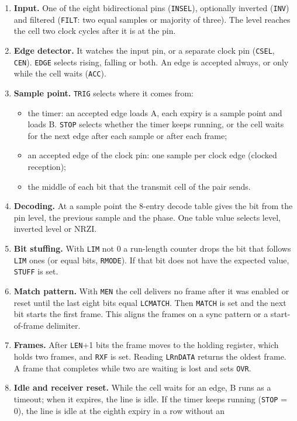\documentclass[10pt,a4paper]{article}
\newcommand{\reg}[1]{\texttt{#1}}
\begin{document}
\begin{enumerate}
\item \textbf{Input.} One of the eight bidirectional pins (\reg{INSEL}), optionally inverted (\reg{INV}) and filtered
(\reg{FILT}: two equal samples or majority of three). The level reaches the cell two clock cycles after it is at
the pin.
\item \textbf{Edge detector.} It watches the input pin, or a separate clock pin (\reg{CSEL}, \reg{CEN}). \reg{EDGE}
selects rising, falling or both. An edge is accepted always, or only while the cell waits (\reg{ACC}).
\item \textbf{Sample point.} \reg{TRIG} selects where it comes from:
  \begin{itemize}
  \item the timer: an accepted edge loads A, each expiry is a sample point and loads B. \reg{STOP} selects whether
  the timer keeps running, or the cell waits for the next edge after each sample or after each frame;
  \item an accepted edge of the clock pin: one sample per clock edge (clocked reception);
  \item the middle of each bit that the transmit cell of the pair sends.
  \end{itemize}
\item \textbf{Decoding.} At a sample point the 8-entry decode table gives the bit from the pin level, the
previous sample and the phase. One table value selects level, inverted level or NRZI.
\item \textbf{Bit stuffing.} With \reg{LIM} not 0 a run-length counter drops the bit that follows \reg{LIM} ones (or
equal bits, \reg{RMODE}). If that bit does not have the expected value, \reg{STUFF} is set.
\item \textbf{Match pattern.} With \reg{MEN} the cell delivers no frame after it was enabled or reset until the last
eight bits equal \reg{LCMATCH}. Then \reg{MATCH} is set and the next bit starts the first frame. This aligns the
frames on a sync pattern or a start-of-frame delimiter.
\item \textbf{Frames.} After \reg{LEN}+1 bits the frame moves to the holding register, which holds two frames, and
\reg{RXF} is set. Reading \reg{LRnDATA} returns the oldest frame. A frame that completes while two are waiting is
lost and sets \reg{OVR}.
\item \textbf{Idle and receiver reset.} While the cell waits for an edge, B runs as a timeout; when it expires, the
line is idle. If the timer keeps running (\reg{STOP} = 0), the line is idle at the eighth expiry in a row without an

\end{enumerate}
\end{document}
